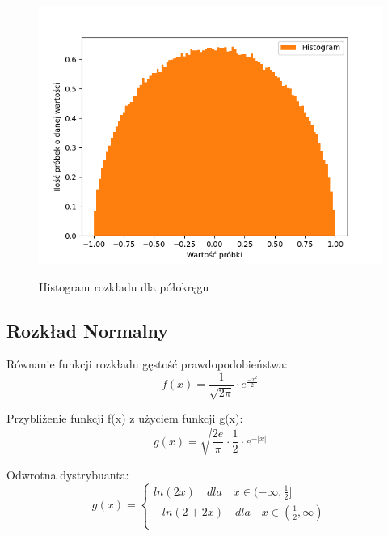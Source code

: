 \documentclass[12pt,a4paper]{article}
\begin{document}
\begin{figure}[H]
  \centering
  \includegraphics[height=0.4\textheight]{figures/Figure_28.png}
  \label{fig:28}
  \caption{Histogram rozkładu dla półokręgu}

\end{figure}

\subsection{Rozkład Normalny}
      
Równanie funkcji rozkładu gęstość prawdopodobieństwa:
\begin{equation}
  f(x) = \frac{1}{\sqrt{2 \pi}} \cdot e^{\frac{-x^2}{2}}
\end{equation}


Przybliżenie funkcji f(x) z użyciem funkcji g(x):
\begin{equation}
  g(x) = \sqrt{\frac{2e}{\pi}} \cdot \frac{1}{2} \cdot e^{-|x|}
\end{equation}

Odwrotna dystrybuanta:
\begin{equation}
  g(x) = \begin{cases}
      ln(2x) \quad dla \quad x  \in (-\infty, \frac{1}{2}]\\
      -ln(2+2x) \quad dla \quad x  \in (\frac{1}{2}, \infty)\\
    \end{cases}   
\end{equation}
\end{document}
